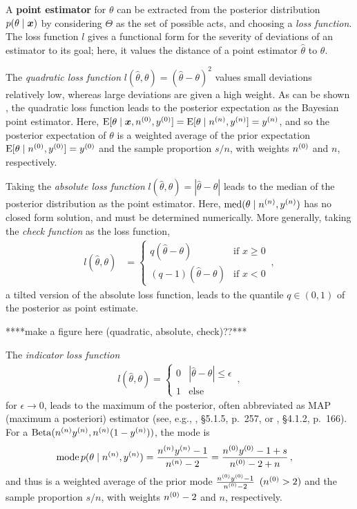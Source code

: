 A \textbf{point estimator} for $\theta$ can be extracted from the posterior distribution $p(\theta\mid{\bm x})$
by considering $\Theta$ as the set of possible acts, and choosing a \emph{loss function}.
The loss function $l$ gives a functional form for the severity of deviations of an estimator to its goal;
here, it values the distance of a point estimator $\hat{\theta}$ to $\theta$.

The \emph{quadratic loss function} $l(\hat{\theta}, \theta) = (\hat{\theta}-\theta)^2$
values small deviations relatively low, whereas large deviations are given a high weight.
As can be shown \parencite[see, e.g.,][pp.~352f]{2002:casella}, %
the quadratic loss function leads to the posterior expectation as the Bayesian point estimator.
Here, $\operatorname{E}[\theta\mid{\bm x}, n^{(0)}, y^{(0)}] = \operatorname{E}[\theta\mid n^{(n)}, y^{(n)}] = y^{(n)}$,
and so the posterior expectation of $\theta$ is a weighted average
of the prior expectation $\operatorname{E}[\theta\mid n^{(0)}, y^{(0)}] = y^{(0)}$ and the sample proportion $s/n$, with weights $n^{(0)}$ and $n$, respectively.

Taking the \emph{absolute loss function} $l(\hat{\theta}, \theta) = |\hat{\theta}-\theta|$
leads to the median of the posterior distribution as the point estimator.
Here, $\operatorname{med}(\theta\mid n^{(n)}, y^{(n)})$ has no closed form solution, and must be determined numerically.
More generally, taking the \emph{check function} as the loss function,
\begin{align*}
l(\hat{\theta}, \theta) &= \begin{cases} q (\hat{\theta}-\theta)     & \text{if } x \ge 0 \\
                                         (q-1) (\hat{\theta}-\theta) & \text{if } x < 0 \end{cases}\,,
\end{align*}
a tilted version of the absolute loss function, 
leads to the quantile $q \in (0,1)$ of the posterior as point estimate.

****make a figure here (quadratic, absolute, check)??***

The \emph{indicator loss function}
\begin{align*}
l(\hat{\theta}, \theta) = \begin{cases} 0 & |\hat{\theta}-\theta| \le \epsilon \\ 1 & \text{else}\end{cases}\,,
\end{align*}
for $\epsilon \to 0$, leads to the maximum of the posterior,
often abbreviated as MAP (maximum a posteriori) estimator
(see, e.g., \cite{2000:bernardosmith}, \S 5.1.5, p.~257, or \cite{2007:robert}, \S 4.1.2, p.~166).
For a $\operatorname{Beta}(n^{(n)}y^{(n)}, n^{(n)}(1-y^{(n)}))$, the mode is
\begin{align*}
\operatorname{mode} p(\theta\mid n^{(n)}, y^{(n)}) &= \frac{n^{(n)}y^{(n)} - 1}{n^{(n)} - 2} = \frac{n^{(0)}y^{(0)} - 1 + s}{n^{(0)} - 2 + n}\,,
\end{align*}
and thus is a weighted average of the prior mode $\frac{n^{(0)}y^{(0)} - 1}{n^{(0)} -2}$ $(n^{(0)} > 2)$
and the sample proportion $s/n$, with weights $n^{(0)} - 2$ and $n$, respectively.

